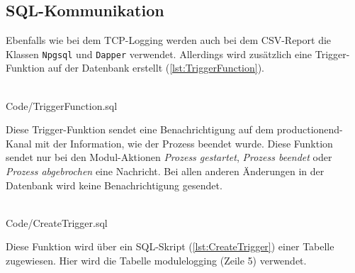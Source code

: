 \subsection{SQL-Kommunikation} 
Ebenfalls wie bei dem TCP-Logging werden auch bei dem CSV-Report die Klassen \texttt{Npgsql} und \texttt{Dapper} verwendet. Allerdings wird zusätzlich eine Trigger-Funktion auf der Datenbank erstellt (\autoref{lst:TriggerFunction}).
\ \\
\begin{minipage}{\textwidth}
\ \\
 {Code/TriggerFunction.sql}
\ \\
\end{minipage}
Diese Trigger-Funktion sendet eine Benachrichtigung auf dem \glqq productionend\grqq{}-Kanal mit der Information, wie der Prozess beendet wurde. Diese Funktion sendet nur bei den Modul-Aktionen \textit{Prozess gestartet}, \textit{Prozess beendet} oder \textit{Prozess abgebrochen} eine Nachricht. Bei allen anderen Änderungen in der Datenbank wird keine Benachrichtigung gesendet. 
\ \\
\begin{minipage}{\textwidth}
\ \\
 {Code/CreateTrigger.sql}
\ \\
\end{minipage}
Diese Funktion wird über ein SQL-Skript (\autoref{lst:CreateTrigger}) einer Tabelle zugewiesen. Hier wird die Tabelle \glqq modulelogging\grqq{} (Zeile 5) verwendet.
